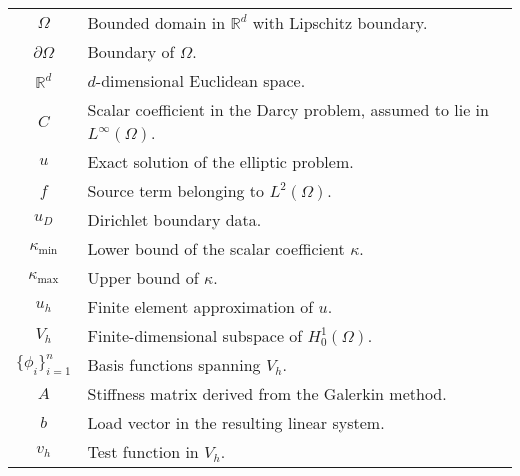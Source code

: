 \begin{longtable}{c p{10cm}}
    $\Omega$               & Bounded domain in $\mathbb{R}^d$ with Lipschitz boundary.                      \\
    $\partial \Omega$      & Boundary of $\Omega$.                                                          \\
    $\mathbb{R}^d$         & $d$-dimensional Euclidean space.                                               \\
    $C$                    & Scalar coefficient in the Darcy problem, assumed to lie in $L^\infty(\Omega)$. \\
    $u$                    & Exact solution of the elliptic problem.                                        \\
    $f$                    & Source term belonging to $L^2(\Omega)$.                                        \\
    $u_D$                  & Dirichlet boundary data.                                                       \\
    $\kappa_{\min}$        & Lower bound of the scalar coefficient $\kappa$.                                \\
    $\kappa_{\max}$        & Upper bound of $\kappa$.                                                       \\
    $u_h$                  & Finite element approximation of $u$.                                           \\
    $V_h$                  & Finite-dimensional subspace of $H_0^1(\Omega)$.                                \\
    $\{\phi_i\}_{i=1}^{n}$ & Basis functions spanning $V_h$.                                                \\
    $A$                    & Stiffness matrix derived from the Galerkin method.                             \\
    $b$                    & Load vector in the resulting linear system.                                    \\
    $v_h$                  & Test function in $V_h$.                                                        \\
\end{longtable}

